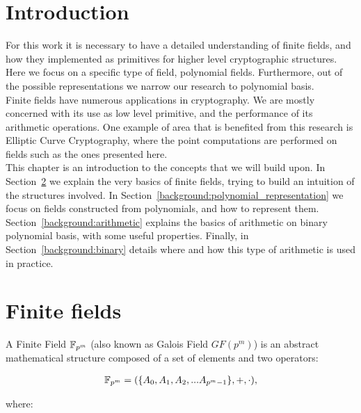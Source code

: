\section{Introduction}

For this work it is necessary to have a detailed understanding of finite fields, and how they implemented as primitives for higher level cryptographic structures. Here we focus on a specific type of field, polynomial fields. Furthermore, out of the possible representations we narrow our research to polynomial basis. \\

Finite fields have numerous applications in cryptography. We are mostly concerned with its use as low level primitive, and the performance of its arithmetic operations. One example of area that is benefited from this research is Elliptic Curve Cryptography, where the point computations are performed on fields such as the ones presented here. \\

This chapter is an introduction to the concepts that we will build upon. In Section~\ref{background:finite_fields} we explain the very basics of finite fields, trying to build an intuition of the structures involved. In Section~\ref{background:polynomial_representation} we focus on fields constructed from polynomials, and how to represent them. Section~\ref{background:arithmetic} explains the basics of arithmetic on binary polynomial basis, with some useful properties. Finally, in Section~\ref{background:binary} details where and how this type of arithmetic is used in practice. \\

\section{Finite fields} \label{background:finite_fields}

A Finite Field $\mathbb{F}_{p^m}$ (also known as Galois Field $GF(p^m)$) is an abstract mathematical structure composed of a set of elements and two operators: 

\begin{gather*}
\mathbb{F}_{p^m} = (\{A_0, A_1, A_2, ... A_{p^m-1}\}, +, \cdot),
\end{gather*}

where:

